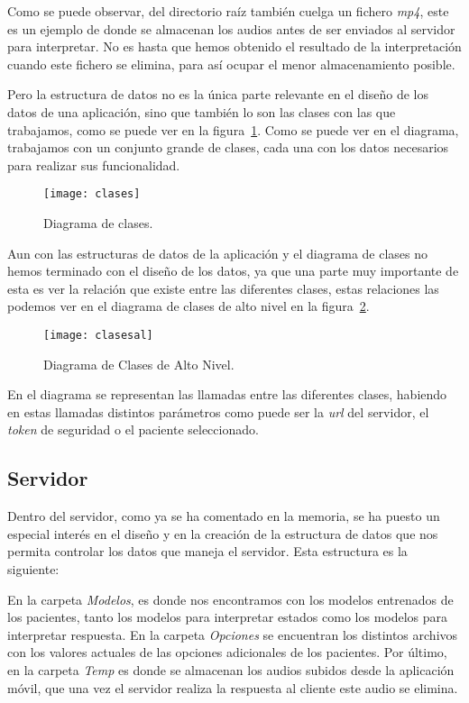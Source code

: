 Como se puede observar, del directorio raíz también cuelga un fichero \textit{mp4}, este es un ejemplo de donde se almacenan los audios antes de ser enviados al servidor para interpretar. No es hasta que hemos obtenido el resultado de la interpretación cuando este fichero se elimina, para así ocupar el menor almacenamiento posible.

Pero la estructura de datos no es la única parte relevante en el diseño de los datos de una aplicación, sino que también lo son las clases con las que trabajamos, como se puede ver en la figura~\ref{fig:clases}. Como se puede ver en el diagrama, trabajamos con un conjunto grande de clases, cada una con los datos necesarios para realizar sus funcionalidad.

\begin{figure}[H]
	\centering
	\texttt{[image: clases]}
	\caption{Diagrama de clases.}
	\label{fig:clases}
\end{figure}

Aun con las estructuras de datos de la aplicación y el diagrama de clases no hemos terminado con el diseño de los datos, ya que una parte muy importante de esta es ver la relación que existe entre las diferentes clases, estas relaciones las podemos ver en el diagrama de clases de alto nivel en la figura~\ref{fig:clasesal}.

\begin{figure}[H]
	\centering
	\texttt{[image: clasesal]}
	\caption{Diagrama de Clases de Alto Nivel.}
	\label{fig:clasesal}
\end{figure}

En el diagrama se representan las llamadas entre las diferentes clases, habiendo en estas llamadas distintos parámetros como puede ser la \textit{url} del servidor, el \textit{token} de seguridad o el paciente seleccionado.

\subsection{Servidor} \label{server}
Dentro del servidor, como ya se ha comentado en la memoria, se ha puesto un especial interés en el diseño y en la creación de la estructura de datos que nos permita controlar los datos que maneja el servidor. Esta estructura es la siguiente:

En la carpeta \textit{Modelos}, es donde nos encontramos con los modelos entrenados de los pacientes, tanto los modelos para interpretar estados como los modelos para interpretar respuesta. En la carpeta \textit{Opciones} se encuentran los distintos archivos con los valores actuales de las opciones adicionales de los pacientes. Por último, en la carpeta \textit{Temp} es donde se almacenan los audios subidos desde la aplicación móvil, que una vez el servidor realiza la respuesta al cliente este audio se elimina.
